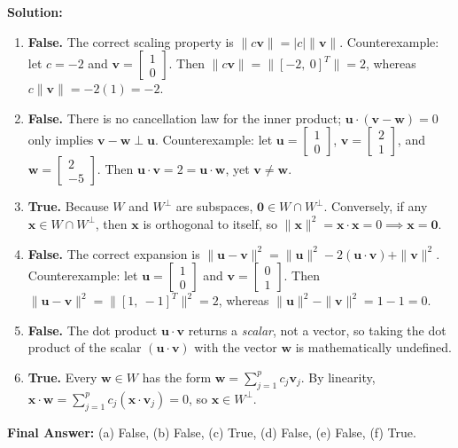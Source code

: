\documentclass[11pt, letterpaper]{article}
\theoremstyle{definition}
\theoremstyle{remark}
\begin{document}
\textbf{Solution:}
\begin{enumerate}[label=(\alph*)]
    \item \textbf{False.} The correct scaling property is $\|c\mathbf{v}\| = |c|\|\mathbf{v}\|$. Counterexample: let $c = -2$ and $\mathbf{v} = \begin{bmatrix} 1 \\ 0 \end{bmatrix}$. Then $\|c\mathbf{v}\| = \|[-2,\ 0]^T\| = 2$, whereas $c\|\mathbf{v}\| = -2(1) = -2$.
    \item \textbf{False.} There is no cancellation law for the inner product; $\mathbf{u} \cdot (\mathbf{v} - \mathbf{w}) = 0$ only implies $\mathbf{v} - \mathbf{w} \perp \mathbf{u}$. Counterexample: let $\mathbf{u} = \begin{bmatrix} 1 \\ 0 \end{bmatrix}$, $\mathbf{v} = \begin{bmatrix} 2 \\ 1 \end{bmatrix}$, and $\mathbf{w} = \begin{bmatrix} 2 \\ -5 \end{bmatrix}$. Then $\mathbf{u} \cdot \mathbf{v} = 2 = \mathbf{u} \cdot \mathbf{w}$, yet $\mathbf{v} \neq \mathbf{w}$.
    \item \textbf{True.} Because $W$ and $W^{\perp}$ are subspaces, $\mathbf{0} \in W \cap W^{\perp}$. Conversely, if any $\mathbf{x} \in W \cap W^{\perp}$, then $\mathbf{x}$ is orthogonal to itself, so $\|\mathbf{x}\|^2 = \mathbf{x} \cdot \mathbf{x} = 0 \implies \mathbf{x} = \mathbf{0}$.
    \item \textbf{False.} The correct expansion is $\|\mathbf{u} - \mathbf{v}\|^2 = \|\mathbf{u}\|^2 - 2(\mathbf{u} \cdot \mathbf{v}) + \|\mathbf{v}\|^2$. Counterexample: let $\mathbf{u} = \begin{bmatrix} 1 \\ 0 \end{bmatrix}$ and $\mathbf{v} = \begin{bmatrix} 0 \\ 1 \end{bmatrix}$. Then $\|\mathbf{u} - \mathbf{v}\|^2 = \|[1,\ -1]^T\|^2 = 2$, whereas $\|\mathbf{u}\|^2 - \|\mathbf{v}\|^2 = 1 - 1 = 0$.
    \item \textbf{False.} The dot product $\mathbf{u} \cdot \mathbf{v}$ returns a \emph{scalar}, not a vector, so taking the dot product of the scalar $(\mathbf{u} \cdot \mathbf{v})$ with the vector $\mathbf{w}$ is mathematically undefined.
    \item \textbf{True.} Every $\mathbf{w} \in W$ has the form $\mathbf{w} = \sum_{j=1}^{p} c_j \mathbf{v}_j$. By linearity, $\mathbf{x} \cdot \mathbf{w} = \sum_{j=1}^{p} c_j (\mathbf{x} \cdot \mathbf{v}_j) = 0$, so $\mathbf{x} \in W^{\perp}$.
\end{enumerate}
\textbf{Final Answer:} (a) False, (b) False, (c) True, (d) False, (e) False, (f) True.
\end{document}
